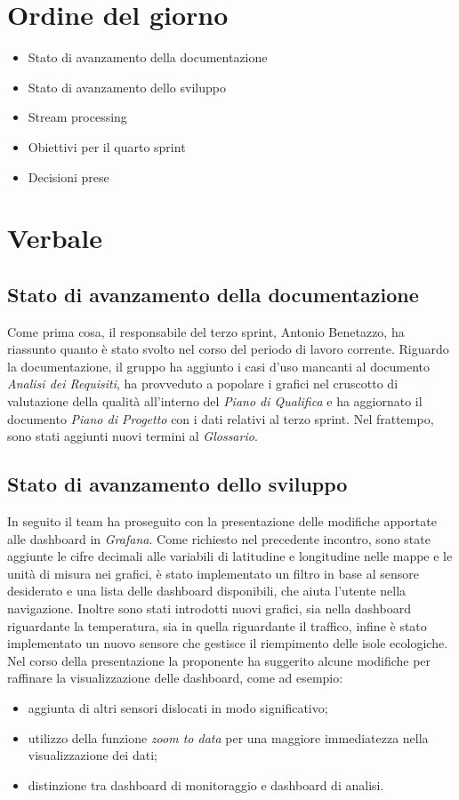 \documentclass[italian,12pt]{article}
\begin{document}
\section{Ordine del giorno}
\begin{itemize}
	\item Stato di avanzamento della documentazione
	\item Stato di avanzamento dello sviluppo
	\item Stream processing
	\item Obiettivi per il quarto sprint
	\item Decisioni prese
\end{itemize}

\newpage

\section{Verbale}

\subsection{Stato di avanzamento della documentazione}
Come prima cosa, il responsabile del terzo sprint, Antonio Benetazzo, ha riassunto quanto è stato svolto nel corso del periodo di lavoro corrente.
Riguardo la documentazione, il gruppo ha aggiunto i casi d'uso mancanti al documento \textit{Analisi dei Requisiti}, 
ha provveduto a popolare i grafici nel cruscotto di valutazione della qualità all'interno del \textit{Piano di Qualifica} e
ha aggiornato il documento \textit{Piano di Progetto} con i dati relativi al terzo sprint. Nel frattempo, sono stati aggiunti nuovi termini al \textit{Glossario}.

\subsection{Stato di avanzamento dello sviluppo}
In seguito il team ha proseguito con la presentazione delle modifiche apportate alle dashboard in \textit{Grafana}. Come richiesto nel precedente
incontro, sono state aggiunte le cifre decimali alle variabili di latitudine e longitudine nelle mappe e le unità di misura nei grafici,
è stato implementato un filtro in base al sensore desiderato e una lista delle dashboard disponibili, che aiuta l'utente nella navigazione.
Inoltre sono stati introdotti nuovi grafici, sia nella dashboard riguardante la temperatura, sia in quella riguardante il traffico, infine
è stato implementato un nuovo sensore che gestisce il riempimento delle isole ecologiche. Nel corso della presentazione la proponente ha suggerito
alcune modifiche per raffinare la visualizzazione delle dashboard, come ad esempio:
\begin{itemize}
	\item aggiunta di altri sensori dislocati in modo significativo;
	\item utilizzo della funzione \textit{zoom to data} per una maggiore immediatezza nella visualizzazione dei dati;
	\item distinzione tra dashboard di monitoraggio e dashboard di analisi.
\end{itemize}
\end{document}
